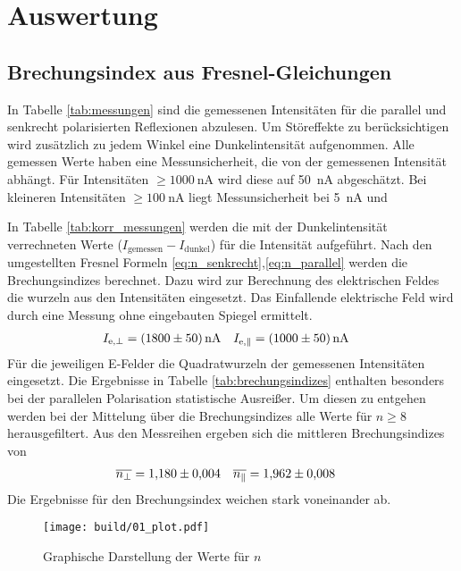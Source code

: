 \section{Auswertung}

\subsection{Brechungsindex aus Fresnel-Gleichungen}



In Tabelle \ref{tab:messungen} sind die gemessenen Intensitäten für die parallel 
und senkrecht polarisierten Reflexionen abzulesen.
Um Störeffekte zu berücksichtigen wird zusätzlich zu jedem Winkel eine Dunkelintensität aufgenommen.
Alle gemessen Werte haben eine Messunsicherheit, die von der gemessenen Intensität abhängt.
Für Intensitäten $\geq \qty{1000}{\nano\ampere}$ wird diese auf \qty{50}{\nano\ampere} abgeschätzt.
Bei kleineren Intensitäten $\geq \qty{100}{\nano\ampere}$ liegt Messunsicherheit bei \qty{5}{\nano\ampere} und 

In Tabelle \ref{tab:korr_messungen} werden die mit der Dunkelintensität verrechneten Werte ($I_\text{gemessen} - I_\text{dunkel}$)
für die Intensität aufgeführt.
Nach den umgestellten Fresnel Formeln \eqref{eq:n_senkrecht},\eqref{eq:n_parallel} werden die Brechungsindizes berechnet.
Dazu wird zur Berechnung des elektrischen Feldes die wurzeln aus den Intensitäten eingesetzt.
Das Einfallende elektrische Feld wird durch eine Messung ohne eingebauten Spiegel ermittelt.
\begin{align}
    I_{\text{e},\perp} &= \qty{1800 \pm 50}{\nano\ampere} & I_{\text{e},\parallel} &= \qty{1000 \pm 50}{\nano\ampere}
\end{align} 
Für die jeweiligen E-Felder die Quadratwurzeln der gemessenen Intensitäten eingesetzt.
Die Ergebnisse in Tabelle \ref{tab:brechungsindizes} enthalten besonders bei der 
parallelen Polarisation statistische Ausreißer. 
Um diesen zu entgehen werden bei der Mittelung über die Brechungsindizes alle Werte für $n \geq 8$ herausgefiltert.
Aus den Messreihen ergeben sich die mittleren Brechungsindizes von 
\begin{align}
    \overline{n_\perp} &= \num{1.180 \pm 0.004} & \overline{n_\parallel} &= \num{1.962 \pm 0.008}
\end{align}
Die Ergebnisse für den Brechungsindex weichen stark voneinander ab.
\begin{figure}
    \centering
    \texttt{[image: build/01\_plot.pdf]}
    \caption{Graphische Darstellung der Werte für $n$}
\end{figure}

